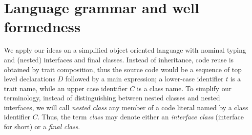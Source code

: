 \section{Language grammar and well formedness}
We apply our ideas on a simplified object oriented language with nominal typing and (nested)
interfaces  and final classes.
Instead of inheritance, code reuse is obtained by trait composition, thus the source code would be
a sequence of top level declarations $D$ followed by a main expression;
a lower-case identifier $t$ is a trait name, while an upper case
identifier $C$ is a class name.
To simplify our terminology, instead of distinguishing between 
nested classes and nested interfaces, we will call \emph{nested class} any member of a code literal 
named by a class identifier $C$. Thus, the term \emph{class} may denote either an \emph{interface class} (interface for short) or a \emph{final class}.

